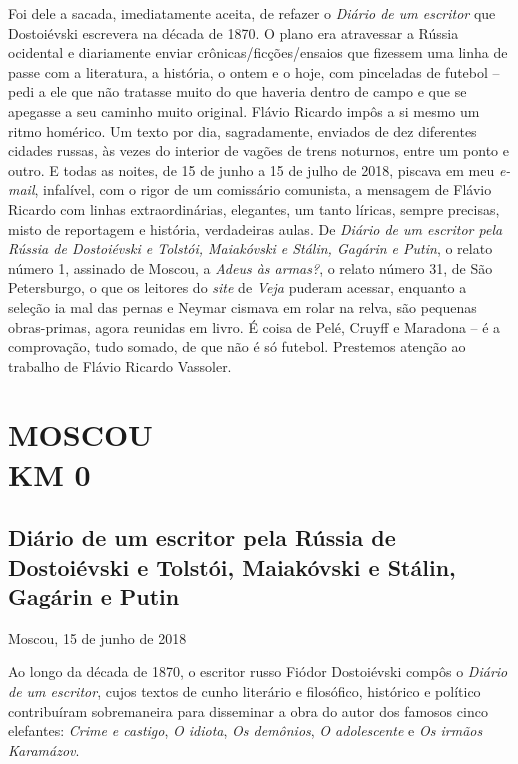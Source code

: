 Foi dele a sacada, imediatamente aceita, de refazer o \emph{Diário de um
escritor} que Dostoiévski escrevera na década de 1870. O plano era
atravessar a Rússia ocidental e diariamente enviar
crônicas/ficções/ensaios que fizessem uma linha de passe com a
literatura, a história, o ontem e o hoje, com pinceladas de futebol --
pedi a ele que não tratasse muito do que haveria dentro de campo e que
se apegasse a seu caminho muito original. Flávio Ricardo impôs a si
mesmo um ritmo homérico. Um texto por dia, sagradamente, enviados de dez
diferentes cidades russas, às vezes do interior de vagões de trens
noturnos, entre um ponto e outro. E todas as noites, de 15 de junho a 15
de julho de 2018, piscava em meu \emph{e-mail}, infalível, com o rigor
de um comissário comunista, a mensagem de Flávio Ricardo com linhas
extraordinárias, elegantes, um tanto líricas, sempre precisas, misto de
reportagem e história, verdadeiras aulas. De \emph{Diário de um escritor
pela Rússia de Dostoiévski e Tolstói, Maiakóvski e Stálin, Gagárin e
Putin}, o relato número 1, assinado de Moscou, a \emph{Adeus às armas?},
o relato número 31, de São Petersburgo, o que os leitores do \emph{site}
de \emph{Veja} puderam acessar, enquanto a seleção ia mal das pernas e
Neymar cismava em rolar na relva, são pequenas obras-primas, agora
reunidas em livro. É coisa de Pelé, Cruyff e Maradona -- é a
comprovação, tudo somado, de que não é só futebol. Prestemos atenção ao
trabalho de Flávio Ricardo Vassoler.

\newpage
{}
\part*{MOSCOU\\KM 0}

\chapter*{Diário de um escritor pela Rússia de Dostoiévski e Tolstói, Maiakóvski e Stálin, Gagárin e Putin}

\begin{flushright}
Moscou, 15 de junho de 2018
\end{flushright}

Ao longo da década de 1870, o escritor russo Fiódor Dostoiévski compôs o
\emph{Diário de um escritor}, cujos textos de cunho literário e
filosófico, histórico e político contribuíram sobremaneira para
disseminar a obra do autor dos famosos cinco elefantes: \emph{Crime e
castigo}, \emph{O idiota}, \emph{Os demônios}, \emph{O adolescente} e
\emph{Os irmãos Karamázov}.

